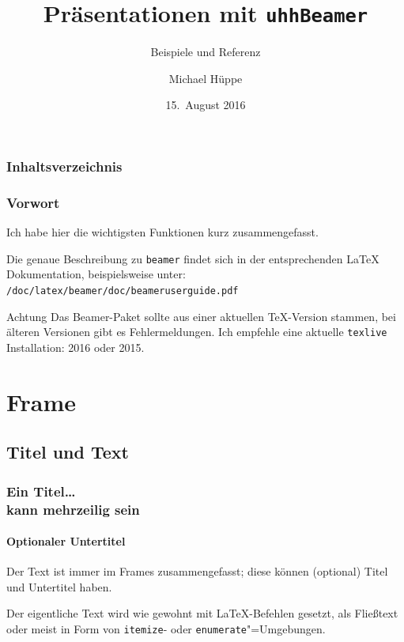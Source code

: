 \documentclass[usepdftitle=false, t]{beamer}
\title[UHH-Folien]			%
  {Präsentationen mit \texttt{uhhBeamer}}
\subtitle[Beispiele]			%
  {Beispiele und Referenz}
\author[M. Hüppe]{Michael Hüppe}
\date[15-aug-2016]			%
  {15.~August 2016}
\begin{document}
\frame{\titlepage}

\begin{frame}
  \frametitle{Inhaltsverzeichnis}%
  \tableofcontents
\end{frame}

\begin{frame}
  \frametitle{Vorwort}
  Ich habe hier die wichtigsten Funktionen kurz zusammengefasst.
  \bvskip

  Die genaue Beschreibung zu \texttt{beamer} findet sich in der
  entsprechenden \LaTeX{} Dokumentation, beispielsweise unter:
  {\small{}%
	\texttt{/doc/latex/beamer/doc/beameruserguide.pdf}}
  \bvskip

  \begin{block}{Achtung}
  Das Beamer-Paket sollte aus einer aktuellen \TeX -Version stammen,
  bei älteren Versionen gibt es Fehlermeldungen. Ich empfehle eine
  aktuelle \texttt{texlive} Installation: 2016 oder 2015.
  \end{block}
\end{frame}

\section{Frame}				%
\subsection{Titel und Text}		%

\begin{frame}
  \frametitle{Ein Titel\ldots\\			%
	kann mehrzeilig sein}
  \framesubtitle{Optionaler Untertitel}		%
  Der Text ist immer im \alert{Frames} zusammengefasst;
  diese können (optional) Titel und Untertitel haben.

  Der eigentliche Text wird wie gewohnt mit \LaTeX{}-Befehlen gesetzt,
  als Fließtext oder meist in Form von
  \texttt{itemize}- oder \texttt{enumerate}"=Umgebungen.
\end{frame}
\end{document}

